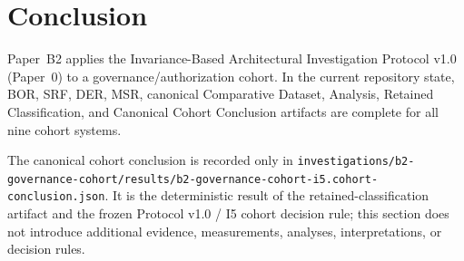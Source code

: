\section{Conclusion}
Paper~B2 applies the Invariance-Based Architectural Investigation Protocol v1.0 (Paper~0) to a governance/authorization cohort. In the current repository state, BOR, SRF, DER, MSR, canonical Comparative Dataset, Analysis, Retained Classification, and Canonical Cohort Conclusion artifacts are complete for all nine cohort systems.

The canonical cohort conclusion is recorded only in \texttt{investigations/b2-governance-cohort/results/b2-governance-cohort-i5.cohort-conclusion.json}. It is the deterministic result of the retained-classification artifact and the frozen Protocol v1.0 / I5 cohort decision rule; this section does not introduce additional evidence, measurements, analyses, interpretations, or decision rules.
